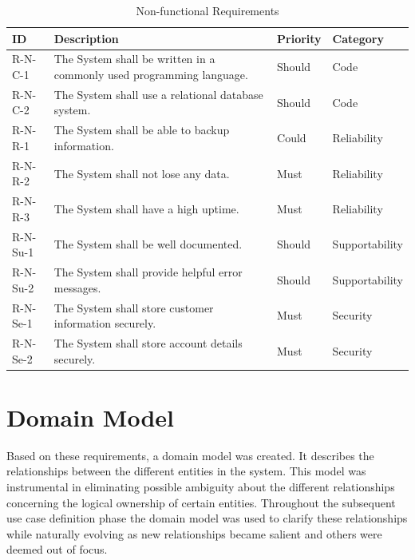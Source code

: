 \begin{table}[H]
    \centering
    \begin{tabular}{| p{1.8cm} | p{9cm} | P{1.5cm} | P{2.7cm} | }
        \hline
         ID      & Description & Priority & Category \\ \hline
        R-N-C-1  & The System shall be written in a commonly used programming language. & Should & Code \\ \hline
        R-N-C-2  & The System shall use a relational database system. & Should & Code \\ \hline
        R-N-R-1  & The System shall be able to backup information. & Could & Reliability \\ \hline
        R-N-R-2  & The System shall not lose any data. & Must & Reliability \\ \hline
        R-N-R-3  & The System shall have a high uptime. & Must & Reliability \\ \hline
        R-N-Su-1 & The System shall be well documented. & Should & Supportability \\ \hline
        R-N-Su-2 & The System shall provide helpful error messages. & Should & Supportability \\ \hline
        R-N-Se-1 & The System shall store customer information securely. & Must & Security \\ \hline
        R-N-Se-2 & The System shall store account details securely. & Must & Security \\ \hline
    \end{tabular}
    \caption{Non-functional Requirements}
    \label{requirements:non-functional}
\end{table}

\section{Domain Model}

Based on these requirements, a domain model was created. It describes the relationships between the different entities in the system. This model was instrumental in eliminating possible ambiguity about the different relationships concerning the logical ownership of certain entities. Throughout the subsequent use case definition phase the domain model was used to clarify these relationships while naturally evolving as new relationships became salient and others were deemed out of focus.

